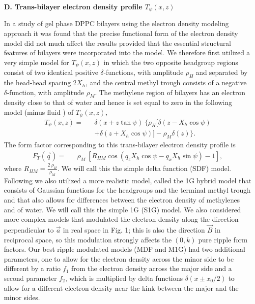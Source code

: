 
\vspace{0.128in}
\noindent
{\bf D. Trans-bilayer electron density profile $T_{\psi}(x,z)$}
\vspace{0.128in}

In a study of gel phase DPPC bilayers using the electron
density modeling approach \cite{WSN89} it was found
that the precise functional form of the electron density model did not
much affect the results provided that the essential structural
features of bilayers were incorporated into the model.
We therefore first utilized a very simple model for $T_{\psi}(x,z)$ in
which the two opposite headgroup regions consist of
two identical positive $\delta$-functions, with amplitude $\rho_H$ and 
separated by the head-head spacing $2X_h$, and
the central methyl trough consists of a negative $\delta$-function, with amplitude
$\rho_M$.  The methylene region of bilayers has an electron density
close to that of water and hence is set equal to zero in the
following model (minus fluid \cite{WKMc73}) of $T_{\psi}(x,z)$,
\begin{eqnarray}
\label{transbi}
T_{\psi}(x,z) =&& \delta (x + z \tan \psi)\ \{ \rho_H 
	[\delta (z-X_h\cos \psi) \nonumber\\
&& +\delta (z+X_h \cos \psi)]-\rho_M \delta (z) \}.
\end{eqnarray}
The form factor corresponding to this trans-bilayer electron density profile is
\begin{eqnarray}
\label{form_trans}
F_T (\vec{q}) =&& \rho_M\ [R_{HM} \cos (q_z X_h \cos \psi - 
q_x X_h \sin \psi) -1],
\end{eqnarray}
where \(R_{HM} = \frac{2\ \rho_H}{ \rho_M}\).   We will call this the
simple delta function (SDF) model.
Following \cite{WSN89} we also utilized a more realistic model, called the 1G 
hybrid model that consists of Gaussian functions for the headgroups and
the terminal methyl trough and that also allows for differences between the 
electron density of methylenes and of water.  We will call this the simple 
1G (S1G) model.
We also considered more complex models that modulated the electron density
along the direction perpendicular to $\vec{a}$ in real space in Fig. 1; this is
also the direction $\vec{B}$ in reciprocal space, so this modulation strongly
affects the $(0,k)$ pure ripple form factors. Our best ripple modulated 
models (MDF and M1G) had two additional parameters, one to allow for the 
electron density across the minor side to be different by a ratio $f_1$
from the electron density across the major side and a second parameter
$f_2$, which is multiplied by delta functions ${\delta}(x \pm x_0/2)$ to 
allow for a
different electron density near the kink between the major and the minor sides.

